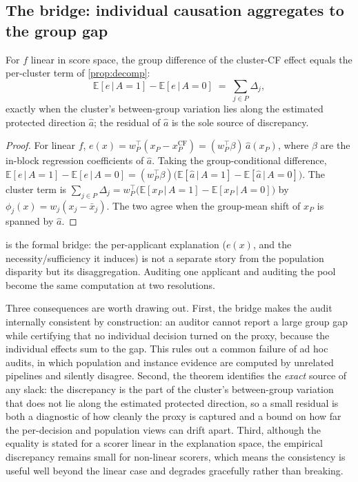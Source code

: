 \documentclass[sn-mathphys-num]{sn-jnl}
\newcommand{\Exp}{\mathbb{E}}
\newcommand{\given}{\,\vert\,}
\begin{document}
\subsection{The bridge: individual causation aggregates to the group gap}
\label{sec:bridge}
\begin{theorem}
\label{thm:bridge}
For $f$ linear in score space, the group difference of the cluster-CF effect
equals the per-cluster term of \cref{prop:decomp}:
\[
  \Exp[e\given A{=}1]-\Exp[e\given A{=}0]\;=\;\sum_{j\in P}\Delta_j,
\]
exactly when the cluster's between-group variation lies along the estimated
protected direction $\hat a$; the residual of $\hat a$ is the sole source of
discrepancy.
\end{theorem}
\begin{proof}
For linear $f$, $e(x)=w_P^\top(x_P-x_P^{\mathrm{CF}})=(w_P^\top\beta)\,\hat a(x_P)$,
where $\beta$ are the in-block regression coefficients of $\hat a$. Taking the
group-conditional difference,
$\Exp[e\given A{=}1]-\Exp[e\given A{=}0]=(w_P^\top\beta)\bigl(\Exp[\hat a\given A{=}1]-\Exp[\hat a\given A{=}0]\bigr)$.
The cluster term is
$\sum_{j\in P}\Delta_j=w_P^\top\bigl(\Exp[x_P\given A{=}1]-\Exp[x_P\given A{=}0]\bigr)$
by $\phi_j(x)=w_j(x_j-\bar x_j)$. The two agree when the group-mean shift of
$x_P$ is spanned by $\hat a$.
\end{proof}
\noindent
{} is the formal bridge: the per-applicant explanation
($e(x)$, and the necessity/sufficiency it induces) is not a separate story from
the population disparity but its disaggregation. Auditing one applicant and
auditing the pool become the same computation at two resolutions.

Three consequences are worth drawing out. First, the bridge makes the audit
internally consistent by construction: an auditor cannot report a large group gap
while certifying that no individual decision turned on the proxy, because the
individual effects sum to the gap. This rules out a common failure of ad hoc
audits, in which population and instance evidence are computed by unrelated
pipelines and silently disagree. Second, the theorem identifies the \emph{exact}
source of any slack: the discrepancy is the part of the cluster's between-group
variation that does not lie along the estimated protected direction, so a small
residual is both a diagnostic of how cleanly the proxy is captured and a bound on
how far the per-decision and population views can drift apart. Third, although the
equality is stated for a scorer linear in the explanation space, the empirical
discrepancy remains small for non-linear scorers, which means the consistency is
useful well beyond the linear case and degrades gracefully rather than breaking.
\end{document}
